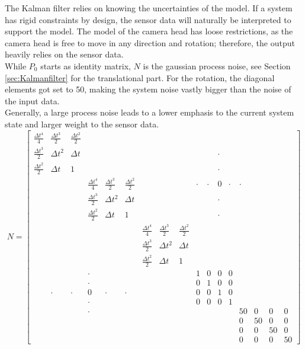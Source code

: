 The Kalman filter relies on knowing the uncertainties of the model. If a system has rigid constraints by design, the sensor data will naturally be interpreted to support the model. The model of the camera head has loose restrictions, as the camera head is free to move in any direction and rotation; therefore, the output heavily relies on the sensor data.\\
While $P_{0}$ starts as identity matrix, $N$ is the gaussian process noise, see Section \ref{sec:Kalmanfilter} for the translational part. For the rotation, the diagonal elements got set to 50, making the system noise vastly bigger than the noise of the input data.\\
Generally, a large process noise leads to a lower emphasis to the current system state and larger weight to the sensor data.\\ 
\begin{equation*}
    N = 
    \begin{bmatrix}
        \frac{\Delta t^{4}}{4} & \frac{\Delta t^{3}}{2} & \frac{\Delta t^{2}}{2} &  &  &  &  &  &  &  &  &  & & &  &  &  \\
        \frac{\Delta t^{3}}{2} & \Delta t^{2} & \Delta t  & &  &  &  &  &  &  &  & \cdot &  &  &  &  &  \\
        \frac{\Delta t^{2}}{2} & \Delta t & 1 &  &  &  &  &  &  &  &  & \cdot &  &  &  &  &  \\
         &  &  &  \frac{\Delta t^{4}}{4} & \frac{\Delta t^{3}}{2} & \frac{\Delta t^{2}}{2}  &  &  &  & \cdot & \cdot & 0 & \cdot & \cdot &  &  &  \\
         &  &  &  \frac{\Delta t^{3}}{2} & \Delta t^{2} & \Delta t &  &  &  &  &  & \cdot &  &  &  & &  \\
         &  &  &  \frac{\Delta t^{2}}{2} & \Delta t & 1 &  &  &  &  &  & \cdot &  &  &  &  &  \\
         &  &  &  &  &  &  \frac{\Delta t^{4}}{4} & \frac{\Delta t^{3}}{2} & \frac{\Delta t^{2}}{2} &  &  &  &  &  &  &  &  \\
         &  &  &  &  &  &  \frac{\Delta t^{3}}{2} & \Delta t^{2} & \Delta t &  &  &  &  &  &  &  &  \\
         &  &  &  &  &  &  \frac{\Delta t^{2}}{2} & \Delta t & 1 &  &  &  &  &  &  &  &  \\
         &  &  & \cdot &  &  &  &  &  & 1 & 0 & 0 & 0 &  &  &  &  \\
         &  &  & \cdot &  &  &  &  &  & 0 & 1 & 0 & 0 & &  &  &  \\
         & \cdot & \cdot & 0 & \cdot & \cdot &  &  &  & 0 & 0 & 1 & 0 &  & &  &  \\
         &  &  & \cdot &  &  &  &  &  & 0 & 0 & 0 &  1 &  &  &  &  \\
         &  &  & \cdot &  &  &  &  &  &  &  &  &  & 50 & 0 & 0 & 0 \\
         &  &  &  &  &  &  &  &  &  &  &  &  & 0 & 50 & 0 & 0 \\
         &  &  &  &  &  &  &  &  &  &  &  &  & 0 & 0 & 50 & 0 \\
         &  &  &  &  &  &  &  &  &  &  &  &  & 0 & 0 & 0 & 50
    \end{bmatrix}
\end{equation*}
